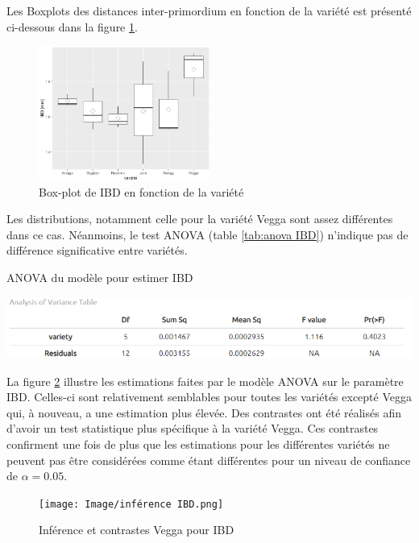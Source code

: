 Les Boxplots des distances inter-primordium en fonction de la variété est présenté ci-dessous dans la figure \ref{fig:boxplot IBD}.
\newpage

\begin{figure}[ht]
\centering
\includegraphics[width=0.5\textwidth]{Image/boxplot IBD.png}
\caption{Box-plot de IBD en fonction de la variété}
\label{fig:boxplot IBD}
\end{figure}

Les distributions, notamment celle pour la variété Vegga sont assez différentes dans ce cas.
Néanmoins, le test ANOVA (table \ref{tab:anova IBD}) n'indique pas de différence significative entre variétés.

\begin{table}[ht]
    \centering
    \caption{ANOVA du modèle pour estimer IBD}
    \includegraphics[width=1\textwidth]{Image/anova IBD.png}
    \label{tab:anova IBD}
\end{table}

La figure \ref{fig:inférence IBD} illustre les estimations faites par le modèle ANOVA sur le paramètre IBD.
Celles-ci sont relativement semblables pour toutes les variétés excepté Vegga qui, à nouveau, a une estimation plus élevée.
Des contrastes ont été réalisés afin d'avoir un test statistique plus spécifique à la variété Vegga.
Ces contrastes confirment une fois de plus que les estimations pour les différentes variétés ne peuvent pas être considérées comme étant différentes pour un niveau de confiance de $\alpha = 0.05$.
\newpage

\begin{figure}[ht]
\centering
\texttt{[image: Image/inférence IBD.png]}
\caption{Inférence et contrastes Vegga pour IBD}
\label{fig:inférence IBD}
\end{figure}

